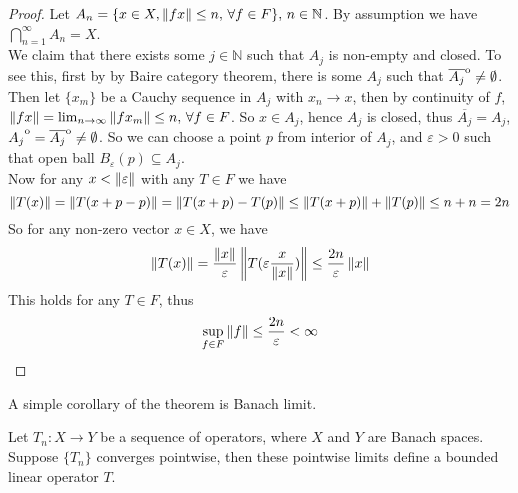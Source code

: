 \documentclass{article}
\begin{document}
\begin{proof}
Let $A_n=\{
	x\in X, \left\|{fx}\right\|\leq n,\,\forall f\in F
	\},\,n\in\mathbb{N}$. By assumption we have $\bigcap_{n=1}^\infty A_n=X$.\\
We claim that there exists some $j\in \mathbb{N}$ such that $A_j$ is non-empty and closed. To see this, first by by Baire category theorem, there is some $A_j$ such that $\overline{A_j}\strut^\mathrm{o}\not=\emptyset$. Then let $\{x_m\}$ be a Cauchy sequence in $A_j$ with $x_n\xrightarrow{}x$, then by continuity of $f$, $\left\|{fx}\right\|=\lim_{n\to\infty}\left\|{fx_m}\right\|\leq n,\,\forall f\in F$. So $x\in A_j$, hence $A_j$ is closed, thus $\overline{A_j}=A_j$, $A_j\strut^\mathrm{o}=\overline{A_j}\strut^\mathrm{o}\not=\emptyset$. So we can choose a point $p$ from interior of $A_j$, and $\varepsilon>0$ such that open ball $B_{\varepsilon}(p)\subseteq A_j$.\\
Now for any $x<\left\|{\varepsilon}\right\|$ with any $T\in F$ we have
$$
	\left\|{T(x)}\right\|=\left\|{T(x+p-p)}\right\|=\left\|{T(x+p)-T(p)}\right\|\leq\left\|{T(x+p)}\right\|+\left\|{T(p)}\right\|\leq n+n=2n
$$
So for any non-zero vector $x\in X$, we have
$$
	\left\|{T(x)}\right\|=\frac{\left\|{x}\right\|}{\varepsilon}\left\|{T(\varepsilon \frac{x}{\left\|{x}\right\|})}\right\|\leq\frac{2n}{\varepsilon}\left\|{x}\right\|
$$
This holds for any $T\in F$, thus
$$
	\sup_{f\in F}\left\|{f}\right\|\leq\frac{2n}{\varepsilon}<\infty
$$
\end{proof}  

A simple corollary of the theorem is Banach limit.
\begin{corollary}\rm\nextline
	Let $T_n:X\xrightarrow{}Y$ be a sequence of operators, where $X$ and $Y$ are Banach spaces. Suppose $\{T_n\}$ converges pointwise,
	then these pointwise limits define a bounded linear operator $T$.
\end{corollary}
\end{document}
